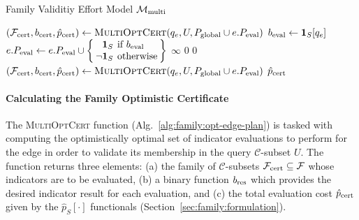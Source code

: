 \begin{algorithm}
\caption{Family Validitiy Effort Model
   $\mathcal{M}_{\mbox{\scriptsize multi}}$}
\label{alg:family:effort-model}
{\algrenewcommand\textproc{}%
\begin{algorithmic}[1]
   \State $(\mathcal{F}_{\mbox{\scriptsize cert}}, b_{\mbox{\scriptsize cert}}, {\hat p}_{\mbox{\scriptsize cert}})
      \leftarrow \mbox{\sc MultiOptCert}(q_e, U,
      P_{\mbox{\scriptsize global}} \cup e.P_{\mbox{\scriptsize eval}})$
      \State $b_{\mbox{\scriptsize eval}} \leftarrow \mathbf{1}_S[q_e]$
      \State $\arraycolsep=2pt
         e.P_{\ms{eval}} \leftarrow e.P_{\ms{eval}} \cup
         \left\{\begin{array}{rl}
         \mathbf{1}_S & \mbox{if } b_{\ms{eval}} \\
         \lnot \mathbf{1}_S & \mbox{otherwise} \\
         \end{array}
         \right\}$
         \State \Return $\infty$
      \EndIf
   \EndFor
   \State \Return $0$
\EndFunction
{}
   \State \Return $0$
\EndFunction
{}
   \State $(\mathcal{F}_{\mbox{\scriptsize cert}}, b_{\mbox{\scriptsize cert}}, {\hat p}_{\mbox{\scriptsize cert}})
      \leftarrow \mbox{\sc MultiOptCert}(q_e, U,
      P_{\mbox{\scriptsize global}} \cup e.P_{\mbox{\scriptsize eval}})$
   \State \Return ${\hat p}_{\mbox{\scriptsize cert}}$
\EndFunction
\end{algorithmic}
} %
\end{algorithm}

\paragraph{Calculating the Family Optimistic Certificate}
The \textsc{MultiOptCert} function (Alg.~\ref{alg:family:opt-edge-plan})
is tasked with computing
the optimistically optimal set of indicator evaluations to perform
for the edge in order to validate its membership in the query
$\mathcal{C}$-subset $U$.
The function returns three elements:
(a) the family of $\mathcal{C}$-subsets
$\mathcal{F}_{\mbox{\scriptsize cert}} \subseteq \mathcal{F}$
whose indicators are to be evaluated,
(b) a binary function $b_{\mbox{\scriptsize res}}$
which provides the desired indicator result for each evaluation,
and (c) the total evaluation cost ${\hat p}_{\mbox{\scriptsize cert}}$
given by the $\hat{p}_S[\cdot]$ functionals
(Section~\ref{sec:family:formulation}).

